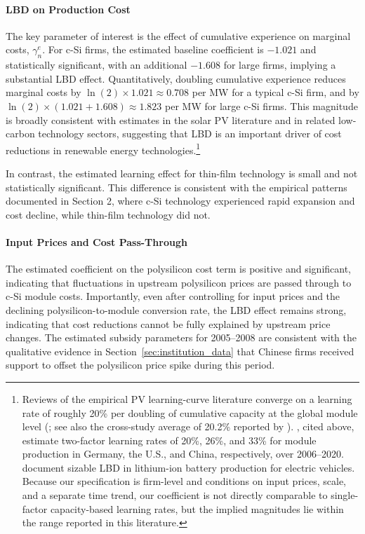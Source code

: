 \documentclass[12pt]{article}
\begin{document}
\paragraph{LBD on Production Cost}
The key parameter of interest is the effect of cumulative experience on marginal costs, $\gamma_n^{e}$. For c-Si firms, the estimated baseline coefficient is $-1.021$ and statistically significant, with an additional $-1.608$ for large firms, implying a substantial LBD effect. Quantitatively, doubling cumulative experience reduces marginal costs by $\ln(2) \times 1.021 \approx 0.708$ per MW for a typical c-Si firm, and by $\ln(2) \times (1.021 + 1.608) \approx 1.823$ per MW for large c-Si firms. This magnitude is broadly consistent with estimates in the solar PV literature and in related low-carbon technology sectors, suggesting that LBD is an important driver of cost reductions in renewable energy technologies.\footnote{Reviews of the empirical PV learning-curve literature converge on a learning rate of roughly 20\% per doubling of cumulative capacity at the global module level (\citealp{rubin2015review}; see also the cross-study average of 20.2\% reported by \citealp{de2013predicting}). \citet{helveston2022quantifying}, cited above, estimate two-factor learning rates of 20\%, 26\%, and 33\% for module production in Germany, the U.S., and China, respectively, over 2006--2020. \citet{barwick2025drive} document sizable LBD in lithium-ion battery production for electric vehicles. Because our specification is firm-level and conditions on input prices, scale, and a separate time trend, our coefficient is not directly comparable to single-factor capacity-based learning rates, but the implied magnitudes lie within the range reported in this literature.}

In contrast, the estimated learning effect for thin-film technology is small and not statistically significant. This difference is consistent with the empirical patterns documented in Section 2, where c-Si technology experienced rapid expansion and cost decline, while thin-film technology did not.

\paragraph{Input Prices and Cost Pass-Through}
The estimated coefficient on the polysilicon cost term is positive and significant, indicating that fluctuations in upstream polysilicon prices are passed through to c-Si module costs. Importantly, even after controlling for input prices and the declining polysilicon-to-module conversion rate, the LBD effect remains strong, indicating that cost reductions cannot be fully explained by upstream price changes. The estimated subsidy parameters for 2005--2008 are consistent with the qualitative evidence in Section~\ref{sec:institution_data} that Chinese firms received support to offset the polysilicon price spike during this period.
\end{document}
